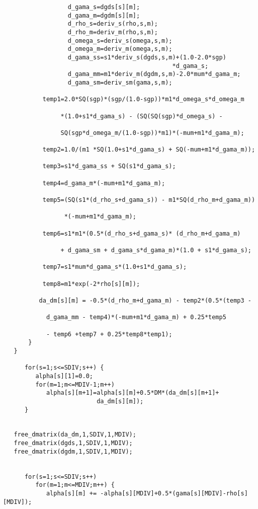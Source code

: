 \begin{verbatim}
                  d_gama_s=dgds[s][m];
                  d_gama_m=dgdm[s][m];
                  d_rho_s=deriv_s(rho,s,m);
                  d_rho_m=deriv_m(rho,s,m);
                  d_omega_s=deriv_s(omega,s,m);
                  d_omega_m=deriv_m(omega,s,m);
                  d_gama_ss=s1*deriv_s(dgds,s,m)+(1.0-2.0*sgp)
                                               *d_gama_s;
                  d_gama_mm=m1*deriv_m(dgdm,s,m)-2.0*mum*d_gama_m;  
                  d_gama_sm=deriv_sm(gama,s,m);

           temp1=2.0*SQ(sgp)*(sgp/(1.0-sgp))*m1*d_omega_s*d_omega_m

                *(1.0+s1*d_gama_s) - (SQ(SQ(sgp)*d_omega_s) - 
 
                SQ(sgp*d_omega_m/(1.0-sgp))*m1)*(-mum+m1*d_gama_m); 
  
           temp2=1.0/(m1 *SQ(1.0+s1*d_gama_s) + SQ(-mum+m1*d_gama_m));

           temp3=s1*d_gama_ss + SQ(s1*d_gama_s);
  
           temp4=d_gama_m*(-mum+m1*d_gama_m);
   
           temp5=(SQ(s1*(d_rho_s+d_gama_s)) - m1*SQ(d_rho_m+d_gama_m))

                 *(-mum+m1*d_gama_m);

           temp6=s1*m1*(0.5*(d_rho_s+d_gama_s)* (d_rho_m+d_gama_m) 
  
                + d_gama_sm + d_gama_s*d_gama_m)*(1.0 + s1*d_gama_s); 

           temp7=s1*mum*d_gama_s*(1.0+s1*d_gama_s);

           temp8=m1*exp(-2*rho[s][m]);
 
          da_dm[s][m] = -0.5*(d_rho_m+d_gama_m) - temp2*(0.5*(temp3 - 

            d_gama_mm - temp4)*(-mum+m1*d_gama_m) + 0.25*temp5 

            - temp6 +temp7 + 0.25*temp8*temp1);	 
       }
   }

      for(s=1;s<=SDIV;s++) {
         alpha[s][1]=0.0;
         for(m=1;m<=MDIV-1;m++) 
            alpha[s][m+1]=alpha[s][m]+0.5*DM*(da_dm[s][m+1]+
                          da_dm[s][m]);
      } 
 

   free_dmatrix(da_dm,1,SDIV,1,MDIV);
   free_dmatrix(dgds,1,SDIV,1,MDIV);
   free_dmatrix(dgdm,1,SDIV,1,MDIV);


      for(s=1;s<=SDIV;s++)          
         for(m=1;m<=MDIV;m++) {     
            alpha[s][m] += -alpha[s][MDIV]+0.5*(gama[s][MDIV]-rho[s][MDIV]);


\end{verbatim}

